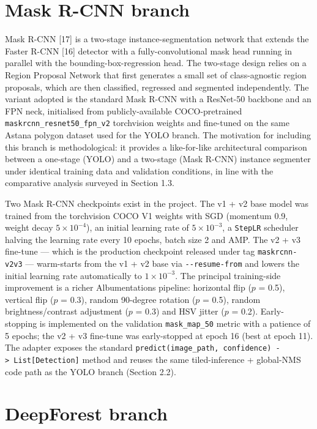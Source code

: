 \section{Mask R-CNN branch}\label{mask-r-cnn-branch}

Mask R-CNN {[}17{]} is a two-stage instance-segmentation network that extends the Faster R-CNN {[}16{]} detector with a fully-convolutional mask head running in parallel with the bounding-box-regression head. The two-stage design relies on a Region Proposal Network that first generates a small set of class-agnostic region proposals, which are then classified, regressed and segmented independently. The variant adopted is the standard Mask R-CNN with a ResNet-50 backbone and an FPN neck, initialised from publicly-available COCO-pretrained \texttt{maskrcnn\_resnet50\_fpn\_v2} torchvision weights and fine-tuned on the same Astana polygon dataset used for the YOLO branch. The motivation for including this branch is methodological: it provides a like-for-like architectural comparison between a one-stage (YOLO) and a two-stage (Mask R-CNN) instance segmenter under identical training data and validation conditions, in line with the comparative analysis surveyed in Section 1.3.

Two Mask R-CNN checkpoints exist in the project. The v1 + v2 base model was trained from the torchvision COCO V1 weights with SGD (momentum 0.9, weight decay \(5 \times 10^{-4}\)), an initial learning rate of \(5 \times 10^{-3}\), a \texttt{StepLR} scheduler halving the learning rate every 10 epochs, batch size 2 and AMP. The v2 + v3 fine-tune --- which is the production checkpoint released under tag \texttt{maskrcnn-v2v3} --- warm-starts from the v1 + v2 base via \texttt{-\/-resume-from} and lowers the initial learning rate automatically to \(1 \times 10^{-3}\). The principal training-side improvement is a richer Albumentations pipeline: horizontal flip (\(p\) = 0.5), vertical flip (\(p\) = 0.3), random 90-degree rotation (\(p\) = 0.5), random brightness/contrast adjustment (\(p\) = 0.3) and HSV jitter (\(p\) = 0.2). Early-stopping is implemented on the validation \texttt{mask\_map\_50} metric with a patience of 5 epochs; the v2 + v3 fine-tune was early-stopped at epoch 16 (best at epoch 11). The adapter exposes the standard \texttt{predict(image\_path,\ confidence)\ -\textgreater{}\ List{[}Detection{]}} method and reuses the same tiled-inference + global-NMS code path as the YOLO branch (Section 2.2).

\section{DeepForest branch}\label{deepforest-branch}


